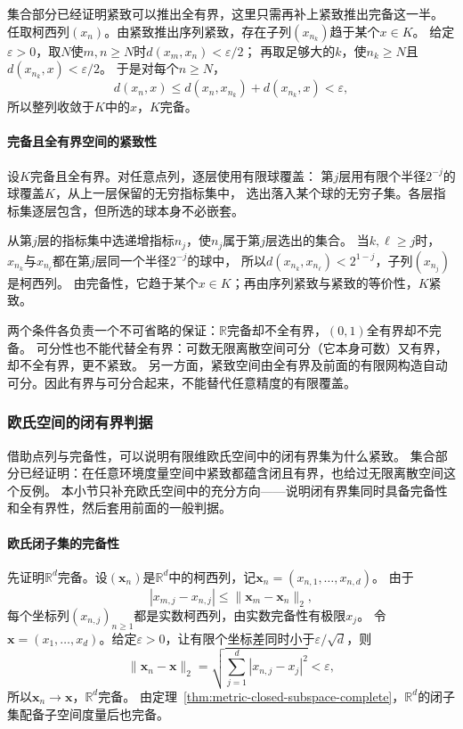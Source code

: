 集合部分已经证明紧致可以推出全有界，这里只需再补上紧致推出完备这一半。
任取柯西列$(x_n)$。由紧致推出序列紧致，存在子列$(x_{n_k})$趋于某个$x\in K$。
给定$\varepsilon>0$，取$N$使$m,n\geq N$时$d(x_m,x_n)<\varepsilon/2$；
再取足够大的$k$，使$n_k\geq N$且$d(x_{n_k},x)<\varepsilon/2$。
于是对每个$n\geq N$，
\[
  d(x_n,x)\leq d(x_n,x_{n_k})+d(x_{n_k},x)<\varepsilon,
\]
所以整列收敛于$K$中的$x$，$K$完备。

\paragraph{完备且全有界空间的紧致性}

设$K$完备且全有界。对任意点列，逐层使用有限球覆盖：
第$j$层用有限个半径$2^{-j}$的球覆盖$K$，从上一层保留的无穷指标集中，
选出落入某个球的无穷子集。各层指标集逐层包含，但所选的球本身不必嵌套。

从第$j$层的指标集中选递增指标$n_j$，使$n_j$属于第$j$层选出的集合。
当$k,\ell\geq j$时，$x_{n_k}$与$x_{n_\ell}$都在第$j$层同一个半径$2^{-j}$的球中，
所以$d(x_{n_k},x_{n_\ell})<2^{1-j}$，子列$(x_{n_j})$是柯西列。
由完备性，它趋于某个$x\in K$；再由序列紧致与紧致的等价性，$K$紧致。

两个条件各负责一个不可省略的保证：$\mathbb R$完备却不全有界，$(0,1)$全有界却不完备。
可分性也不能代替全有界：可数无限离散空间可分（它本身可数）又有界，却不全有界，更不紧致。
另一方面，紧致空间由全有界及前面的有限网构造自动可分。因此有界与可分合起来，不能替代任意精度的有限覆盖。

\subsubsection{欧氏空间的闭有界判据}
\label{sec:metric-closed-bounded-limits}

借助点列与完备性，可以说明有限维欧氏空间中的闭有界集为什么紧致。
集合部分已经证明：在任意环境度量空间中紧致都蕴含闭且有界，也给过无限离散空间这个反例。
本小节只补充欧氏空间中的充分方向——说明闭有界集同时具备完备性和全有界性，然后套用前面的一般判据。

\paragraph{欧氏闭子集的完备性}

先证明$\mathbb R^d$完备。设$(\bm{x}_n)$是$\mathbb R^d$中的柯西列，记$\bm{x}_n=(x_{n,1},\ldots,x_{n,d})$。
由于
\[
  |x_{m,j}-x_{n,j}|\leq\lVert\bm{x}_m-\bm{x}_n\rVert_2,
\]
每个坐标列$(x_{n,j})_{n\geq1}$都是实数柯西列，由实数完备性有极限$x_j$。
令$\bm{x}=(x_1,\ldots,x_d)$。给定$\varepsilon>0$，让有限个坐标差同时小于$\varepsilon/\sqrt d$，则
\[
  \lVert\bm{x}_n-\bm{x}\rVert_2
  =\sqrt{\sum_{j=1}^{d}|x_{n,j}-x_j|^2}<\varepsilon,
\]
所以$\bm{x}_n\to\bm{x}$，$\mathbb R^d$完备。
由定理~\ref{thm:metric-closed-subspace-complete}，$\mathbb R^d$的闭子集配备子空间度量后也完备。

